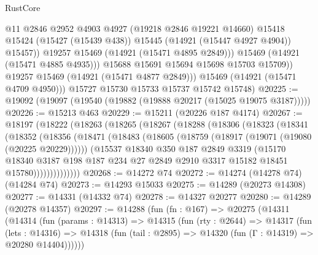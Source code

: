 \begin{lexlean}{RustCore}
\begin{coremodule}
                      @11
                      @2846
                      @2952
                      @4903
                      @4927
                      (@19218 @2846 @19221 @14660)
                      @15418
                      @15424
                      (@15427 (@15439 @438))
                      @15445
                      (@14921 (@15447 @4927 @4904))
                      @15457))
                  @19257
                  @15469
                  (@14921 (@15471 @4895 @2849)))
                @15469
                (@14921 (@15471 @4885 @4935)))
              @15688
              @15691
              @15694
              @15698
              @15703
              @15709))
          @19257
          @15469
          (@14921 (@15471 @4877 @2849)))
        @15469
        (@14921 (@15471 @4709 @4950)))
      @15727
      @15730
      @15733
      @15737
      @15742
      @15748)
@20225 := @19092 (@19097 (@19540 (@19882 (@19888 @20217 (@15025 @19075 @3187)))))
@20226 := @15213 @463
@20229 := @15211 (@20226 @187 @4174)
@20267 := @18197
    (@18222
      (@18263
        (@18265
          (@18267
            (@18288
              (@18306
                (@18323
                  (@18341
                    (@18352
                      (@18356
                        (@18471
                          (@18483
                            (@18605 (@18759 (@18917 (@19071 (@19080 (@20225 @20229))))))
                            (@15537
                              @18340
                              @350
                              @187
                              @2849
                              @3319
                              (@15170
                                @18340
                                @3187
                                @198
                                @187
                                @234
                                @27
                                @2849
                                @2910
                                @3317
                                @15182
                                @18451
                                @15780))))))))))))))
@20268 := @14272 @74
@20272 := @14274 (@14278 @74) (@14284 @74)
@20273 := @14293 @15033
@20275 := @14289 (@20273 @14308)
@20277 := @14331 (@14332 @74)
@20278 := @14327 @20277
@20280 := @14289 (@20278 @14357)
@20297 := @14288
    (fun (fn : @167) =>
    @20275
      (@14311
        (@14314
          (fun (params : @14313) =>
          @14315
            (fun (rty : @2644) =>
            @14317
              (fun (lets : @14316) =>
              @14318 (fun (tail : @2895) => @14320 (fun (Γ : @14319) => @20280 @14404))))))

\end{coremodule}
\end{lexlean}
